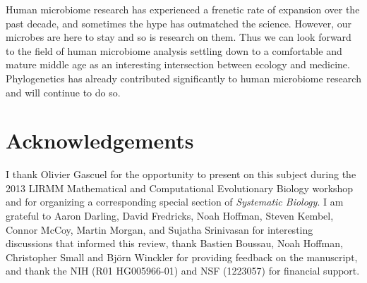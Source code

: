 \documentclass{amsart}
\newcommand{\notforarxiv}[1]{}
\begin{document}
Human microbiome research has experienced a frenetic rate of expansion over the past decade, and sometimes the hype has outmatched the science.
However, our microbes are here to stay and so is research on them.
Thus we can look forward to the field of human microbiome analysis settling down to a comfortable and mature middle age as an interesting intersection between ecology and medicine.
Phylogenetics has already contributed significantly to human microbiome research and will continue to do so.



\section{Acknowledgements}
I thank Olivier Gascuel for the opportunity to present on this subject during the 2013 LIRMM Mathematical and Computational Evolutionary Biology workshop and for organizing a corresponding special section of \textit{Systematic Biology}.
I am grateful to Aaron Darling, David Fredricks, Noah Hoffman, Steven Kembel, Connor McCoy, Martin Morgan, and Sujatha Srinivasan for interesting discussions that informed this review, thank Bastien Boussau, Noah Hoffman, Christopher Small and Bj\"orn Winckler for providing feedback on the manuscript, and thank the NIH (R01 HG005966-01) and NSF (1223057) for financial support.


\notforarxiv{
\newpage
\section{Figure Legends}

\noindent
Figure 1: \pdLegend

\noindent
Figure 2: \unifracLegend

\noindent
Figure 3: \dirtpilesLegend


\newpage
}



\end{document}
